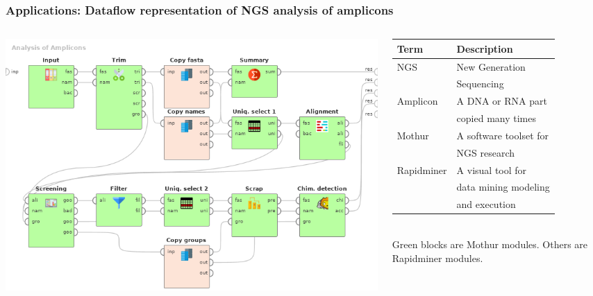 \documentclass[10pt]{beamer}
\begin{document}
\begin{frame}
  \frametitle{Applications: Dataflow representation of NGS analysis of amplicons}
  \begin{columns}
    \begin{column}{0.6\textwidth}
      \begin{raggedright}
        \includegraphics[width=1\linewidth]{Dataflow-color-en.png}
      \end{raggedright}
    \end{column}
    \begin{column}{0.4\textwidth}\footnotesize
      \begin{tabular}{ll}
        Term & Description \\
        \hline
        NGS & New Generation\\ & Sequencing\\
        Amplicon & A DNA or RNA part \\
                 & copied many times \\
        Mothur & A software toolset for\\ & NGS research \\
        Rapidminer & A visual tool for \\
             & data mining modeling\\
             &  and execution
      \end{tabular}
      ${}$\\[1em]
      Green blocks are Mothur modules. Others are Rapidminer modules.
    \end{column}
  \end{columns}
\end{frame}
\end{document}
